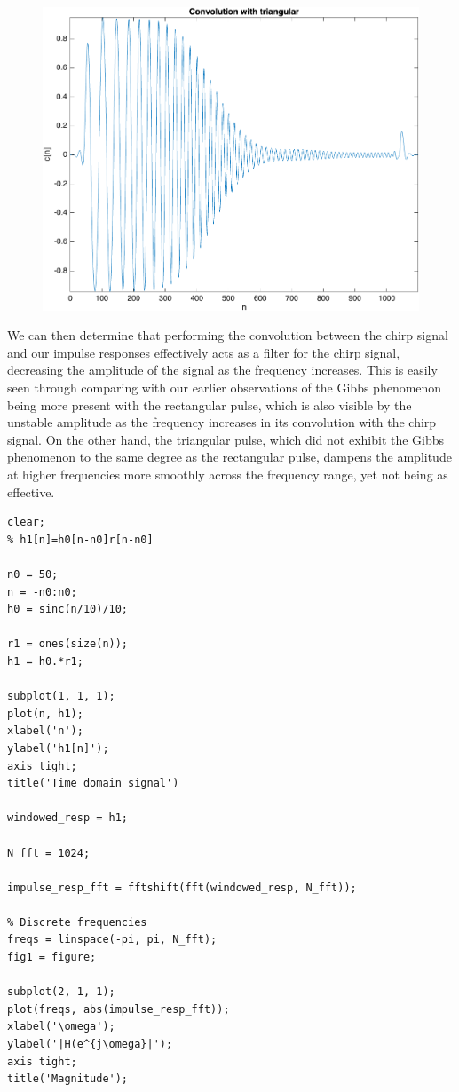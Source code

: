 \documentclass[12pt]{article}
\begin{document}
\begin{enumerate}[label=\textbf{\alph*)}, leftmargin=2.6em]
\begin{figure} [H]
\end{figure}
\begin{figure} [H]
    \centering
    \includegraphics[width=0.75\linewidth]{24.png}
\end{figure}
We can then determine that performing the convolution between the chirp signal and our impulse responses effectively acts as a filter for the chirp signal, decreasing the amplitude of the signal as the frequency increases. This is easily seen through comparing with our earlier observations of the Gibbs phenomenon being more present with the rectangular pulse, which is also visible by the unstable amplitude as the frequency increases in its convolution with the chirp signal. On the other hand, the triangular pulse, which did not exhibit the Gibbs phenomenon to the same degree as the rectangular pulse, dampens the amplitude at higher frequencies more smoothly across the frequency range, yet not being as effective.
\begin{verbatim}
clear;
% h1[n]=h0[n-n0]r[n-n0]

n0 = 50;
n = -n0:n0;
h0 = sinc(n/10)/10;

r1 = ones(size(n));
h1 = h0.*r1;

subplot(1, 1, 1);
plot(n, h1);
xlabel('n');
ylabel('h1[n]');
axis tight;
title('Time domain signal')

windowed_resp = h1;

N_fft = 1024;

impulse_resp_fft = fftshift(fft(windowed_resp, N_fft));

% Discrete frequencies
freqs = linspace(-pi, pi, N_fft);
fig1 = figure;

subplot(2, 1, 1);
plot(freqs, abs(impulse_resp_fft));
xlabel('\omega');
ylabel('|H(e^{j\omega}|');
axis tight;
title('Magnitude');


\end{verbatim}
\end{enumerate}
\end{document}
